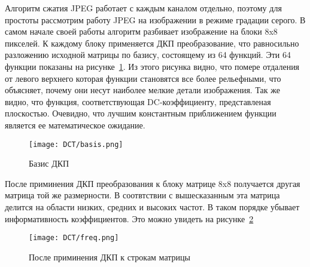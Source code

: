 Алгоритм сжатия JPEG работает с каждым каналом отдельно, поэтому для
простоты рассмотрим работу JPEG на изображении в режиме градации серого.
В самом начале своей работы алгоритм разбивает изображение на блоки
8x8 пикселей. К каждому блоку применяется ДКП преобразование,
что равносильно разложению исходной матрицы по базису, состоящему
из 64 функций. Эти 64 функции показаны на рисунке~\ref{img:basis}.
Из этого рисунка видно, что помере отдаления от левого верхнего которая
функции становятся все более рельефными, что объясняет, почему они несут
наиболее мелкие детали изображения. Так же видно, что функция,
соответствующая DC-коэффициенту, представленая плоскостью. Очевидно,
что лучшим константным приближением функции
является ее математическое ожидание.
\begin{figure}[ht!]
    \centering
    \caption{Базис ДКП}
    \texttt{[image: DCT/basis.png]}
    \label{img:basis}
\end{figure}
После приминения ДКП преобразования к блоку матрице 8x8
получается другая матрица той же размерности. В соотвтствии с вышесказанным
эта матрица делится на области низких, средних и высоких частот. В таком порядке
убывает информативность коэффициентов. Это можно увидеть на рисунке~\ref{img:freq}
\begin{figure}[ht!]
    \centering
    \caption{После приминения ДКП к строкам матрицы}
    \texttt{[image: DCT/freq.png]}
    \label{img:freq}
\end{figure}
